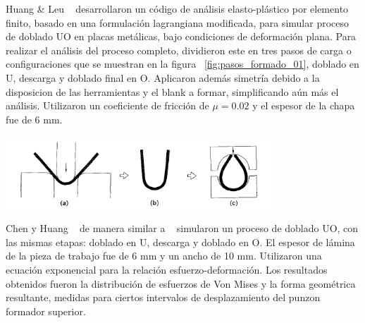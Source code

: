 Huang & Leu ~\cite{huang1995} desarrollaron un código de análisis elasto-plástico por elemento finito, 
basado en una formulación lagrangiana modificada, para simular proceso de doblado UO en placas metálicas, 
bajo condiciones de deformación plana. Para realizar el análisis del proceso completo, dividieron este 
en tres pasos de carga o configuraciones que se muestran en la figura ~\ref{fig:pasos_formado_01}, 
doblado en U, descarga y doblado final en O. Aplicaron además simetría debido a la disposicion de las 
herramientas y el blank a formar, simplificando aún más el análisis. Utilizaron un coeficiente 
de fricción de $\mu = 0.02$ y el espesor de la chapa fue de 6 mm. \\

\begin{center}
\includegraphics[width=0.75\textwidth]{src/ch1/uo-bending.png}
 \label{fig:pasos_formado_01}
\end{center}


Chen y Huang ~\cite{chen2007} de manera similar a ~\cite{huang1995} simularon un proceso de doblado 
UO, con las mismas etapas: doblado en U, descarga y doblado en O. El espesor de lámina de la pieza 
de trabajo fue de 6 mm y un ancho de 10 mm. Utilizaron una ecuación exponencial para la relación 
esfuerzo-deformación. Los resultados obtenidos fueron la distribución 
de esfuerzos de Von Mises y la forma geométrica resultante, medidas para ciertos intervalos 
de desplazamiento del punzon formador superior. \\


